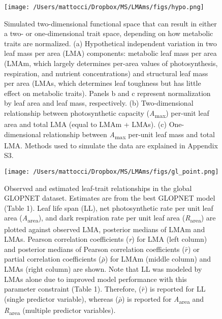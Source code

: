 \documentclass[
  12pt,
  letterpaper,
  DIV=11,
  numbers=noendperiod]{scrartcl}
\begin{document}
\newpage

\begin{figure}

{\centering \texttt{[image: /Users/mattocci/Dropbox/MS/LMAms/figs/hypo.png]}

}

\caption{\label{fig-hypo}Simulated two-dimensional functional space that
can result in either a two- or one-dimensional trait space, depending on
how metabolic traits are normalized. (a) Hypothetical independent
variation in two leaf mass per area (LMA) components: metabolic leaf
mass per area (LMAm, which largely determines per-area values of
photosynthesis, respiration, and nutrient concentrations) and structural
leaf mass per area (LMAs, which determines leaf toughness but has little
effect on metabolic traits). Panels b and c represent normalization by
leaf area and leaf mass, respectively. (b) Two-dimensional relationship
between photosynthetic capacity (\emph{A}\textsubscript{max}) per-unit
leaf area and total LMA (equal to LMAm + LMAs). (c) One-dimensional
relationship between \emph{A}\textsubscript{max} per-unit leaf mass and
total LMA. Methods used to simulate the data are explained in Appendix
S3.}

\end{figure}

\begin{figure}

{\centering \texttt{[image: /Users/mattocci/Dropbox/MS/LMAms/figs/gl\_point.png]}

}

\caption{\label{fig-gl_point}Observed and estimated leaf-trait
relationships in the global GLOPNET dataset. Estimates are from the best
GLOPNET model (Table 1). Leaf life span (LL), net photosynthetic rate
per unit leaf area (\emph{A}\textsubscript{area}), and dark respiration
rate per unit leaf area (\emph{R}\textsubscript{area}) are plotted
against observed LMA, posterior medians of LMAm and LMAs. Pearson
correlation coefficients (\emph{r}) for LMA (left column) and posterior
medians of Pearson correlation coefficients (\(\bar{r}\)) or partial
correlation coefficients (\(\bar{\rho}\)) for LMAm (middle column) and
LMAs (right column) are shown. Note that LL was modeled by LMAs alone
due to improved model performance with this parameter constraint (Table
1). Therefore, (\(\bar{r}\)) is reported for LL (single predictor
variable), whereas (\(\bar{\rho}\)) is reported for
\emph{A}\textsubscript{area} and \emph{R}\textsubscript{area} (multiple
predictor variables).}

\end{figure}
\end{document}
